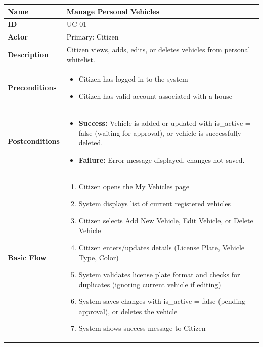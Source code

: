 \documentclass[a4paper]{article}
\newlength{\ucLeft}
\begin{document}
\setlength{\tabcolsep}{6pt}
\renewcommand{\arraystretch}{1.2}
\setlength{\ucLeft}{30mm}

\begin{longtable}{|>{\bfseries}p{\ucLeft}|
                p{\dimexpr\textwidth-\ucLeft-4\tabcolsep-3\arrayrulewidth\relax}|}
\hline
Name & Manage Personal Vehicles \\ \hline
ID & UC-01 \\ \hline
Actor & Primary: Citizen\\ \hline
Description & Citizen views, adds, edits, or deletes vehicles from personal whitelist.\\ \hline
Preconditions &
\begin{itemize}[leftmargin=*, nosep, topsep=0pt, partopsep=0pt, parsep=0pt]
    \item Citizen has logged in to the system
    \item Citizen has valid account associated with a house
\end{itemize}
\\ \hline
Postconditions &
\begin{itemize}[leftmargin=*, nosep, topsep=0pt, partopsep=0pt, parsep=0pt, after=\strut]
    \item \textbf{Success:} Vehicle is added or updated with is\_active = false (waiting for approval), or vehicle is successfully deleted.
    \item \textbf{Failure:} Error message displayed, changes not saved.
\end{itemize}
\\ \hline
Basic Flow & 
\begin{enumerate}[leftmargin=*, nosep, topsep=0pt, partopsep=0pt, parsep=0pt]
    \item Citizen opens the My Vehicles page
    \item System displays list of current registered vehicles
    \item Citizen selects Add New Vehicle, Edit Vehicle, or Delete Vehicle
    \item Citizen enters/updates details (License Plate, Vehicle Type, Color)
    \item System validates license plate format and checks for duplicates (ignoring current vehicle if editing)
    \item System saves changes with is\_active = false (pending approval), or deletes the vehicle
    \item System shows success message to Citizen
\end{enumerate}

\end{longtable}
\end{document}
